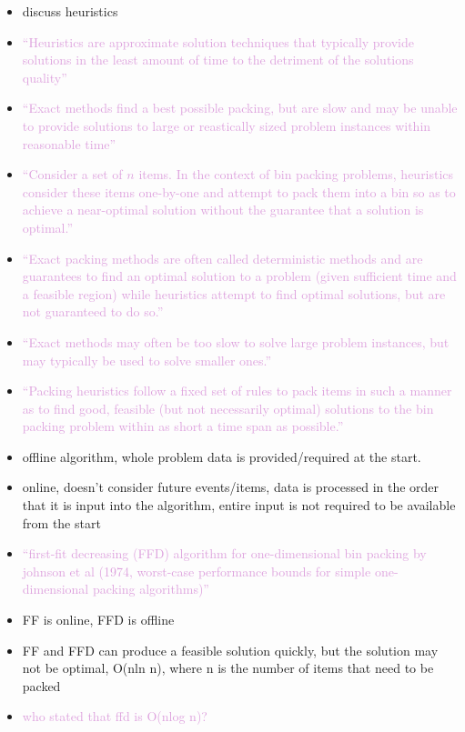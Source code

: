 \documentclass{llncs}
\begin{document}
\begin{itemize}
	\item discuss heuristics
	\item \textcolor{Plum}{``Heuristics are approximate solution techniques that typically provide solutions in the least amount of time to the detriment of the solutions quality''}
	\item \textcolor{Plum}{``Exact methods find a best possible packing, but are slow and may be unable to provide solutions to large or reastically sized problem instances within reasonable time''}
	\item \textcolor{Plum}{``Consider a set of $n$ items. In the context of bin packing problems, heuristics consider these items one-by-one and attempt to pack them into a bin so as to achieve a near-optimal solution without the guarantee that a solution is optimal.''}
	\item \textcolor{Plum}{``Exact packing methods are often called deterministic methods and are guarantees to find an optimal solution to a problem (given sufficient time and a feasible region) while heuristics attempt to find optimal solutions, but are not guaranteed to do so.''}
	\item \textcolor{Plum}{``Exact methods may often be too slow to solve large problem instances, but may typically be used to solve smaller ones.''}
	\item \textcolor{Plum}{``Packing heuristics follow a fixed set of rules to pack items in such a manner as to find good, feasible (but not necessarily optimal) solutions to the bin packing problem within as short a time span as possible.''}
	\item offline algorithm, whole problem data is provided/required at the start.
	\item online, doesn't consider future events/items, data is processed in the order that it is input into the algorithm, entire input is not required to be available from the start
	\item \textcolor{Plum}{``first-fit decreasing (FFD) algorithm for one-dimensional bin packing by johnson et al (1974, worst-case performance bounds for simple one-dimensional packing algorithms)''}
	\item FF is online, FFD is offline
	\item FF and FFD can produce a feasible solution quickly, but the solution may not be optimal, O(nln n), where n is the number of items that need to be packed
	\item \textcolor{Plum}{who stated that ffd is O(nlog n)?}

\end{itemize}
\end{document}
